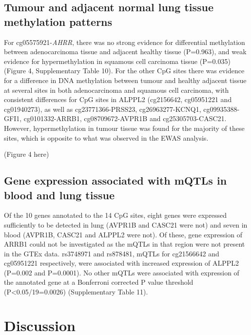 \documentclass[11pt,twoside]{bristolthesis}
\begin{document}
\hypertarget{tumour-and-adjacent-normal-lung-tissue-methylation-patterns}{%
\subsection{Tumour and adjacent normal lung tissue methylation patterns}\label{tumour-and-adjacent-normal-lung-tissue-methylation-patterns}}

For cg05575921-\emph{AHRR}, there was no strong evidence for differential methylation between adenocarcinoma tissue and adjacent healthy tissue (P=0.963), and weak evidence for hypermethylation in squamous cell carcinoma tissue (P=0.035) (Figure 4, Supplementary Table 10). For the other CpG sites there was evidence for a difference in DNA methylation between tumour and healthy adjacent tissue at several sites in both adenocarcinoma and squamous cell carcinoma, with consistent differences for CpG sites in ALPPL2 (cg2156642, cg05951221 and cg01940273), as well as cg23771366-PRSS23, cg26963277-KCNQ1, cg09935388-GFI1, cg0101332-ARRB1, cg08709672-AVPR1B and cg25305703-CASC21. However, hypermethylation in tumour tissue was found for the majority of these sites, which is opposite to what was observed in the EWAS analysis.

(Figure 4 here)

\hypertarget{gene-expression-associated-with-mqtls-in-blood-and-lung-tissue}{%
\subsection{Gene expression associated with mQTLs in blood and lung tissue}\label{gene-expression-associated-with-mqtls-in-blood-and-lung-tissue}}

Of the 10 genes annotated to the 14 CpG sites, eight genes were expressed sufficiently to be detected in lung (AVPR1B and CASC21 were not) and seven in blood (AVPR1B, CASC21 and ALPPL2 were not). Of these, gene expression of ARRB1 could not be investigated as the mQTLs in that region were not present in the GTEx data. rs3748971 and rs878481, mQTLs for cg21566642 and cg05951221 respectively, were associated with increased expression of ALPPL2 (P=0.002 and P=0.0001). No other mQTLs were associated with expression of the annotated gene at a Bonferroni corrected P value threshold (P\textless0.05/19=0.0026) (Supplementary Table 11).

\hypertarget{discussion-1}{%
\section{Discussion}\label{discussion-1}}
\end{document}
